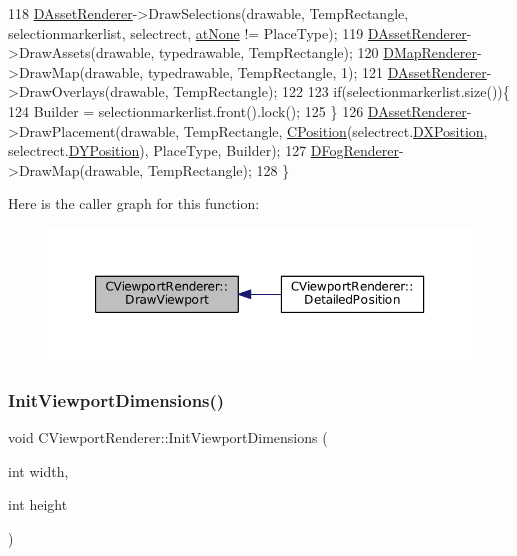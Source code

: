 \begin{DoxyCode}
118     \hyperlink{classCViewportRenderer_a3daa075c87bbdde4d1ada41f0b98f4a8}{DAssetRenderer}->DrawSelections(drawable, TempRectangle, selectionmarkerlist, selectrect, 
      \hyperlink{GameDataTypes_8h_a5600d4fc433b83300308921974477feca82fb51718e2c00981a2d37bc6fe92593}{atNone} != PlaceType);
119     \hyperlink{classCViewportRenderer_a3daa075c87bbdde4d1ada41f0b98f4a8}{DAssetRenderer}->DrawAssets(drawable, typedrawable, TempRectangle);
120     \hyperlink{classCViewportRenderer_ac6bc7771bd6dcd35107d25bebb0c0a4c}{DMapRenderer}->DrawMap(drawable, typedrawable, TempRectangle, 1);
121     \hyperlink{classCViewportRenderer_a3daa075c87bbdde4d1ada41f0b98f4a8}{DAssetRenderer}->DrawOverlays(drawable, TempRectangle);
122     
123     \textcolor{keywordflow}{if}(selectionmarkerlist.size())\{
124         Builder = selectionmarkerlist.front().lock();  
125     \}
126     \hyperlink{classCViewportRenderer_a3daa075c87bbdde4d1ada41f0b98f4a8}{DAssetRenderer}->DrawPlacement(drawable, TempRectangle, 
      \hyperlink{classCPosition}{CPosition}(selectrect.\hyperlink{structSRectangle_abcbddb03b3ee416cc33109833b5f075c}{DXPosition}, selectrect.\hyperlink{structSRectangle_a120aa0a90033bc6e07c36c151a3bbc71}{DYPosition}), PlaceType, Builder);
127     \hyperlink{classCViewportRenderer_a2fa9d183d00bdba4a2fea6d946992608}{DFogRenderer}->DrawMap(drawable, TempRectangle);
128 \}
\end{DoxyCode}
Here is the caller graph for this function\+:\nopagebreak
\begin{figure}[H]
\begin{center}
\leavevmode
\includegraphics[width=350pt]{classCViewportRenderer_ad5cf67fd6d4d69f861dbc0b773cdcab2_icgraph}
\end{center}
\end{figure}
\hypertarget{classCViewportRenderer_ab033e4011819d904d25c74e8876e0517}{}\label{classCViewportRenderer_ab033e4011819d904d25c74e8876e0517} 
\subsubsection{\texorpdfstring{Init\+Viewport\+Dimensions()}{InitViewportDimensions()}}
{\footnotesize\ttfamily void C\+Viewport\+Renderer\+::\+Init\+Viewport\+Dimensions (\begin{DoxyParamCaption}\item[{int}]{width,  }\item[{int}]{height }\end{DoxyParamCaption})\hspace{0.3cm}{\ttfamily [inline]}}



